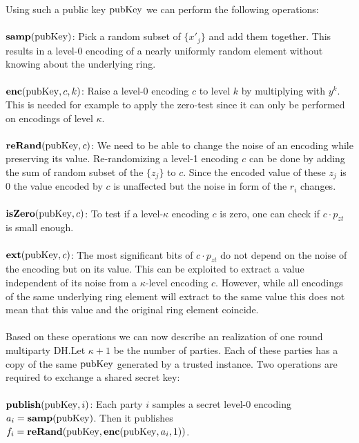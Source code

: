 \documentclass[english]{scrartcl}
\theoremstyle{plain}
\theoremstyle{definition}
\begin{document}
    Using such a public key $\mathrm{pubKey}$ we can perform the following operations:
    \\\\
    $\mathbf{samp}(\mathrm{pubKey})$: Pick a random subset of $\{x'_j\}$ and add them together. This results in a level-0 encoding of a nearly uniformly random element without knowing about the underlying ring.
    \\\\
    $\mathbf{enc}(\mathrm{pubKey}, c, k)$: Raise a level-0 encoding $c$ to level $k$ by multiplying with $y^k$. This is needed for example to apply the zero-test since it can only be performed on encodings of level $\kappa$.
    \\\\
    $\mathbf{reRand}(\mathrm{pubKey}, c)$: We need to be able to change the noise of an encoding while preserving its value. Re-randomizing a level-1 encoding $c$ can be done by adding the sum of random subset of the $\{z_j\}$ to $c$. Since the encoded value of these $z_j$ is 0 the value encoded by $c$ is unaffected but the noise in form of the $r_i$ changes.
    \\\\
    $\mathbf{isZero}(\mathrm{pubKey}, c)$: To test if a level-$\kappa$ encoding $c$ is zero, one can check if $c \cdot p_{zt}$ is small enough.
    \\\\
    $\mathbf{ext}(\mathrm{pubKey}, c)$: The most significant bits of $c \cdot p_{zt}$ do not depend on the noise of the encoding but on its value. This can be exploited to extract a value independent of its noise from a $\kappa$-level encoding $c$. However, while all encodings of the same underlying ring element will extract to the same value this does not mean that this value and the original ring element coincide.
    \\\\
    Based on these operations we can now describe an realization of one round multiparty DH.\@ Let $\kappa + 1$ be the number of parties. Each of these parties has a copy of the same $\mathrm{pubKey}$ generated by a trusted instance. Two operations are required to exchange a shared secret key:
    \\\\
    $\mathbf{publish}(\mathrm{pubKey}, i)$: Each party $i$ samples a secret level-0 encoding $a_i = \mathbf{samp}(\mathrm{pubKey})$.
    Then it publishes $f_i = \mathbf{reRand}(\mathrm{pubKey}, \mathbf{enc}(\mathrm{pubKey}, a_i, 1))$.
    \\\\
\end{document}
